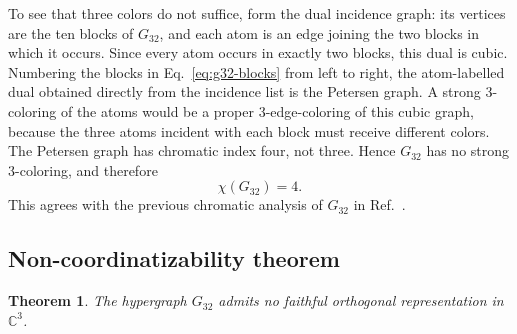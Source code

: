 \documentclass[aps,pra,twocolumn,superscriptaddress,10pt]{revtex4-2}
\newtheorem{theorem}{Theorem}
\newcommand{\C}{\mathbb{C}}
\begin{document}
To see that three colors do not suffice, form the dual incidence graph: its
vertices are the ten blocks of $G_{32}$, and each atom is an edge joining the
two blocks in which it occurs.  Since every atom occurs in exactly two blocks,
this dual is cubic.  Numbering the blocks in Eq.~\eqref{eq:g32-blocks} from
left to right, the atom-labelled dual obtained directly from the incidence
list is the Petersen graph.  A strong 3-coloring
of the atoms would be a proper 3-edge-coloring of this cubic graph, because
the three atoms incident with each block must receive different colors.  The
Petersen graph has chromatic index four, not three.  Hence $G_{32}$ has no
strong 3-coloring, and therefore
\[
    \chi(G_{32})=4.
\]
This agrees with the previous chromatic analysis of $G_{32}$ in
Ref.~\cite{svozil-2021-chroma}.

\subsection{Non-coordinatizability theorem}

\begin{theorem}\label{thm:g32}
The hypergraph $G_{32}$ admits no faithful orthogonal representation in
$\C^3$.
\end{theorem}
\end{document}
